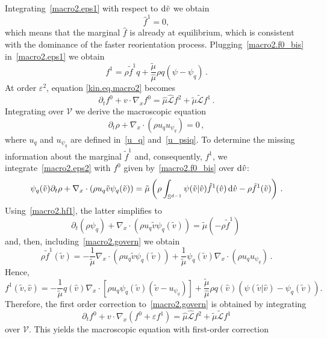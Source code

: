 \documentclass[a4paper]{article}
\theoremstyle{Theorem}\newtheorem{proposition}{Proposition}[section]
\theoremstyle{Remark}\newtheorem{remark}{Remark}[section]
\theoremstyle{Theorem}\newtheorem{theorem}{Theorem}[section]
\newcommand{\hv}{\hat{v}}
\newcommand{\tv}{\tilde{v}}
\newcommand{\hf}{\hat{f}}
\newcommand{\tf}{\tilde{f}}
\newcommand{\hmu}{\hat{\mu}}
\newcommand{\tmu}{\tilde{\mu}}
\newcommand{\intS}{\int_{\mathbb{S}^{d-1}}}
\begin{document}
Integrating~\eqref{macro2.eps1} with respect to ${\rm d}\tv$ we obtain
\begin{equation}\label{macro2.hf1}
    \hf^1=0,
\end{equation}
which means that the marginal $\hf$ is already at equilibrium, which is consistent with the dominance of the faster reorientation process. Plugging~\eqref{macro2.f0_bis} in~\eqref{macro2.eps1} we obtain
\begin{equation*}
    f^1=\rho \tf^1 q +\dfrac{\tmu}{\hmu}\rho q\left(\psi-\psi_q\right)\,.
\end{equation*}
At order $\varepsilon^2$, equation \eqref{kin.eq.macro2} becomes
\begin{equation}\label{macro2.eps2}
    \partial_t f^0 +v\cdot \nabla_x f^0 = \hmu \hat{\mathcal{L}}f^2+\tmu \tilde{\mathcal{L}}f^1\,.
\end{equation}
Integrating over $\mathcal{V}$ we derive the macroscopic equation
\begin{equation}\label{macro2.govern}
    \partial_t \rho +\nabla_x \cdot (\rho u_q u_{\psi_q})=0\,,
\end{equation}
where $u_q$ and $u_{\psi_q}$ are defined in~\eqref{u_q} and~\eqref{u_psiq}. To determine the missing information about the marginal $\tf^1$ and, consequently, $f^1$, we integrate~\eqref{macro2.eps2} with $f^0$ given by~\eqref{macro2.f0_bis} over ${\rm d}\hv$:
\[
\psi_q(\tv)\partial_t \rho  +\nabla_x \cdot \left(\rho u_q\tv\psi_q(\tv)  \right) = \tmu \left(\rho \intS \psi(\tv|\hv) \hat{f}^1(\hv) \, {\rm d} \hv - \rho \tf^1(\tv)\right)\,.
\]
Using~\eqref{macro2.hf1}, the latter simplifies to
\[
\partial_t (\rho \psi_q) +\nabla_x \cdot (\rho u_q\tv\psi_q(\tv)  ) = \tmu ( - \rho \tf^1)\,
\]
and, then, including~\eqref{macro2.govern} we obtain
\begin{equation*}
    \rho\tf^1(\tv)= -\dfrac{1}{\tmu}\nabla_x \cdot (\rho u_q\tv\psi_q(\tv)  )+\dfrac{1}{\tmu}\psi_q(\tv)\nabla_x \cdot (\rho u_q u_{\psi_q})\,.
\end{equation*}
Hence,
\begin{equation*}
    f^1(\tv,\hv)= -\dfrac{1}{\tmu}q(\hv)\nabla_x \cdot \left[\rho u_q\psi_q(\tv) (\tv-u_{\psi_q})\right]+\dfrac{\tmu}{\hmu}\rho q(\hv)(\psi(\tv|\hv)-\psi_q(\tv)).
\end{equation*}
Therefore, the first order correction to~\eqref{macro2.govern} is obtained by integrating
\[
\partial_t f^0 +v\cdot \nabla_x (f^0+\varepsilon f^1) = \hmu \hat{\mathcal{L}}f^2+\tmu \tilde{\mathcal{L}}f^1
\]
over $\mathcal{V}$. This yields the macroscopic equation with first-order correction
\end{document}
